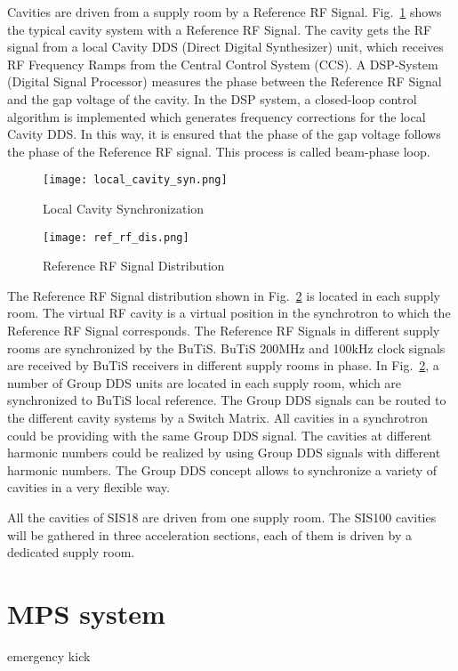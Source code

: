 Cavities are driven from a supply room by a Reference RF Signal. Fig.~\ref{local_cavity_syn} shows the typical cavity system with a Reference RF Signal. The cavity gets the RF signal from a local Cavity DDS (Direct Digital Synthesizer) unit, which receives RF Frequency Ramps from the Central Control System (\gls{CCS}). A \gls{DSP}-System (Digital Signal Processor) measures the phase between the Reference RF Signal and the gap voltage of the cavity. In the DSP system, a closed-loop control algorithm is implemented which generates frequency corrections for the local Cavity DDS. In this way, it is ensured that the phase of the gap voltage follows the phase of the Reference RF signal. This process is called beam-phase loop.
\begin{figure}[!htb]
   \centering   
   \texttt{[image: local\_cavity\_syn.png]}
   \caption{Local Cavity Synchronization}
   \label{local_cavity_syn}
\end{figure}
\begin{figure}[!htb]
   \centering   
   \texttt{[image: ref\_rf\_dis.png]}
   \caption{Reference RF Signal Distribution}
   \label{ref_rf_dis}
\end{figure}
The Reference RF Signal distribution shown in Fig.~\ref{ref_rf_dis} is located in each supply room. The virtual RF cavity is a virtual position in the synchrotron to which the Reference RF Signal corresponds. The Reference RF Signals in different supply rooms are synchronized by the BuTiS. BuTiS 200MHz and 100kHz clock signals are received by BuTiS receivers in different supply rooms in phase. In Fig.~\ref{ref_rf_dis}, a number of Group DDS units are located in each supply room, which are synchronized to BuTiS local reference. The Group DDS signals can be routed to the different cavity systems by a Switch Matrix. All cavities in a synchrotron could be providing with the same Group DDS signal. The cavities at different harmonic numbers could be realized by using Group DDS signals with different harmonic numbers. The Group DDS concept allows to synchronize a variety of cavities in a very flexible way. 

All the cavities of SIS18 are driven from one supply room. The SIS100 cavities will be gathered in three acceleration sections, each of them is driven by a dedicated supply room. 

\section{\gls{MPS} system}
emergency kick


